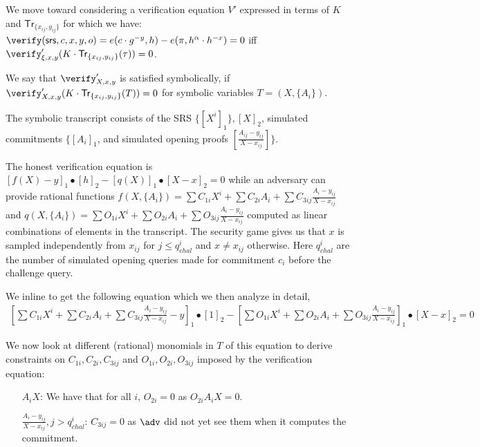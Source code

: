 \documentclass[runningheads,11pt]{llncs}
\begin{document}
We move toward considering a verification equation $V'$ expressed in terms of $K$ and $\mathsf{Tr}_{\{x_{ij},y_{ij}\}}$ for which we have:
$\verify(\srs,c,x,y,o) =  e(c \cdot  g^{-y}, h) - e(\pi , h^{\alpha}\cdot h^{-x}) = 0$ iff $\verify'_{{\xi,x,y}}(K \cdot \mathsf{Tr}_{\{x_{ij},y_{ij}\}} (\tau)) = 0$.

We say that $\verify'_{{X,x,y}}$ is satisfied symbolically, if $\verify'_{{X,x,y}}(K \cdot \mathsf{Tr}_{\{x_{ij},y_{ij}\}} (T)) = 0$ for symbolic variables $T=(X, \{A_{i}\})$.

The symbolic transcript consists of the SRS $\{[X^{i}]_{1}\}, [X]_{2}$, simulated commitments $\{[A_{i}]_{1}$, and simulated opening proofs $ [\frac{A_{ij}-y_{{ij}}}{X-x_{ij}}]\}$.

The honest verification equation is
$[f(X) - y]_1 \bullet [h]_{2} - [q(X)]_1 \bullet [X-x]_{2}=0$ while an adversary can
provide rational functions
$f(X, \{A_{i}\}) = \sum C_{1i} X^{i} + \sum C_{2i} A_{i} + \sum C_{3ij}
\frac{A_{i}-y_{ij}}{X-x_{ij}}$ and
$q(X, \{A_{i}\}) = \sum O_{1i} X^{i} + \sum O_{2i} A_{i} + \sum O_{3ij}
\frac{A_{i}- y_{ij}}{X-x_{ij}}$ computed as linear combinations of elements in the
transcript.
The security game gives us that $x$ is sampled independently from $x_{ij}$ for $j\leq q^{i}_{chal}$ and $x \neq x_{ij}$ otherwise. Here $q^{i}_{chal}$ are the number of simulated opening queries made for commitment $c_{i}$ before the challenge query.

We inline to get the following equation which we then analyze in detail,
\begin{align*}
  \left[\sum C_{1i} X^{i} + \sum C_{2i} A_{i} + \sum C_{3ij} \frac{A_{i}-y_{ij}}{X-x_{ij}} - y\right]_{1} \!\!\!\bullet\! [1]_{2} - \left[\sum O_{1i} X^{i} + \sum O_{2i} A_{i} + \sum O_{3ij} \frac{A_{i}-y_{ij}}{X-x_{ij}}\right]_{1} \!\!\!\bullet\! [X-x]_{2} = 0
  \end{align*}

We now look at different (rational) monomials in $T$ of this equation to derive constraints on $C_{1i}, C_{{2i}},C_{{3ij}}$ and $O_{1i},O_{2i},O_{3ij}$ imposed by the verification equation:
\begin{itemize}
  \item[$A_{i}X$:] We have that for all $i$, $O_{2i}=0$ as $O_{2i} A_{i} X = 0$.
  \item[$\frac{A_{i}-y_{ij}}{X-x_{ij}}, j>q^{i}_{chal}$:] $C_{3ij}=0$ as $\adv$ did not yet see them when it computes the commitment.
\end{itemize}
\end{document}
